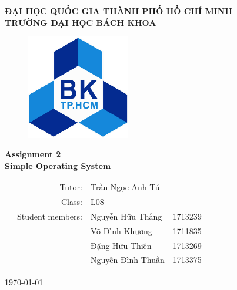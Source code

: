 \begin{titlepage}

	\begin{center}
	\Large
	\textbf{
	ĐẠI HỌC QUỐC GIA THÀNH PHỐ HỒ CHÍ MINH\\
	TRƯỜNG ĐẠI HỌC BÁCH KHOA}
	\end{center}
	
	\vspace{1cm}
	
	\begin{figure}[h!]
	\begin{center}
	\includegraphics[width=4.5cm]{Images/LogoBK}
	\end{center}
	\end{figure}
	
	\vspace{1cm}
	
	
	\begin{center}
	\Huge  \textbf{Assignment 2\\Simple Operating System\\}
	\end{center}
	
	\vspace{1.5cm}
	
	\begin{table}[h]
		\begin{tabular}{rrll}
		
		\hspace{5 cm} & Tutor: &Trần Ngọc Anh Tú &\\
		& Class: &L08&\\
		& Student members: &Nguyễn Hữu Thắng &1713239 \\
		&					&Võ Đình Khương &1711835\\
		& &Đặng Hữu Thiên &1713269\\
		& &Nguyễn Đình Thuần &1713375\\
		
		\end{tabular}
		\end{table}
	
	\vspace{3cm}
	
	\begin{center}
	\today
	\end{center}
	
	\end{titlepage}
	
	
